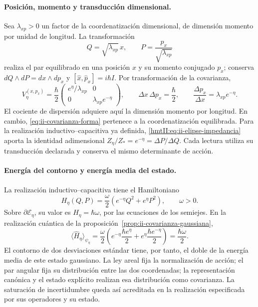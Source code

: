 \paragraph{Posición, momento y transducción dimensional.}
Sea \(\lambda_{xp}>0\) un factor de la coordenatización dimensional, de dimensión
momento por unidad de longitud. La transformación
\[
 Q=\sqrt{\lambda_{xp}}\,x,\qquad
 P=\frac{p_x}{\sqrt{\lambda_{xp}}}
\]
realiza el par equilibrado en una posición \(x\) y su momento conjugado
\(p_x\); conserva \(dQ\wedge dP=dx\wedge dp_x\) y
\([\widehat x,\widehat p_x]=i\hbar I\). Por transformación de la
covarianza,
\begin{equation}
 V_\eta^{(x,p_x)}=\frac{\hbar}{2}
 \begin{pmatrix}e^\eta/\lambda_{xp}&0\\
                 0&\lambda_{xp}e^{-\eta}\end{pmatrix},\qquad
 \Delta x\,\Delta p_x=\frac{\hbar}{2},\qquad
 \frac{\Delta p_x}{\Delta x}=\lambda_{xp}e^{-\eta}.
 \label{eq:ii-covarianza-dimensiones}
\end{equation}
El cociente de dispersión adquiere aquí la dimensión momento por longitud.
En cambio, \eqref{eq:ii-covarianza-forma} pertenece a la coordenatización equilibrada.
Para la realización inductivo--capacitiva ya definida,
\eqref{hmtII:eq:ii-elipse-impedancia} aporta la identidad adimensional
\(Z_\eta/Z_*=e^{-\eta}=\Delta P/\Delta Q\).
Cada lectura utiliza su transducción declarada y conserva el mismo
determinante de acción.

\paragraph{Energía del contorno y energía media del estado.}
La realización inductivo--capacitiva tiene el Hamiltoniano
\[
 H_\eta(Q,P)=\frac{\omega}{2}
 \left(e^{-\eta}Q^2+e^\eta P^2\right),\qquad \omega>0.
\]
Sobre \(\partial\mathcal E_\eta\), su valor es
\(H_\eta=\hbar\omega\), por las ecuaciones de los semiejes. En la
realización cuántica de la proposición~\ref{prop:ii-covarianza-gaussiana},
\begin{equation}
 \langle\widehat H_\eta\rangle_{\psi_\eta}
 =\frac{\omega}{2}
 \left(e^{-\eta}\frac{\hbar e^\eta}{2}
       +e^\eta\frac{\hbar e^{-\eta}}{2}\right)
 =\frac{\hbar\omega}{2}.
 \label{eq:ii-energia-contorno-covarianza}
\end{equation}
El contorno de dos desviaciones estándar tiene, por tanto, el doble de la
energía media de este estado gaussiano. La ley areal fija la normalización
de acción; el par angular fija su distribución entre las dos coordenadas;
la representación canónica y el estado explícito realizan esa distribución
como covarianza. La saturación de incertidumbre queda así acreditada en
la realización especificada por sus operadores y su estado.
